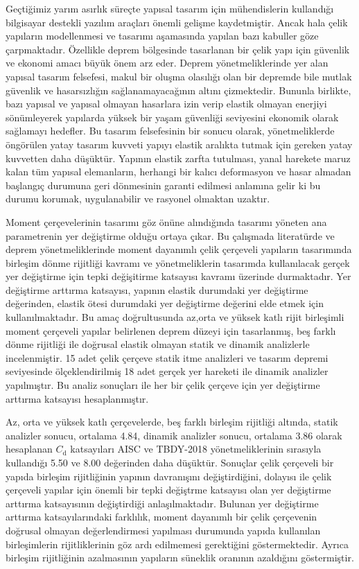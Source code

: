 Geçtiğimiz yarım asırlık süreçte yapısal tasarım için mühendislerin
kullandığı bilgisayar destekli yazılım araçları önemli gelişme kaydetmiştir.
Ancak hala çelik yapıların modellenmesi ve tasarımı aşamasında yapılan
bazı kabuller göze çarpmaktadır. Özellikle deprem bölgesinde tasarlanan
bir çelik yapı için güvenlik ve ekonomi amacı büyük önem arz eder.
Deprem yönetmeliklerinde yer alan yapısal tasarım felsefesi, makul
bir oluşma olasılığı olan bir depremde bile mutlak güvenlik ve hasarsızlığın
sağlanamayacağının altını çizmektedir. Bununla birlikte, bazı yapısal
ve yapısal olmayan hasarlara izin verip elastik olmayan enerjiyi sönümleyerek
yapılarda yüksek bir yaşam güvenliği seviyesini ekonomik olarak sağlamayı
hedefler. Bu tasarım felsefesinin bir sonucu olarak, yönetmeliklerde
öngörülen yatay tasarım kuvveti yapıyı elastik aralıkta tutmak için
gereken yatay kuvvetten daha düşüktür. Yapının elastik zarfta tutulması,
yanal harekete maruz kalan tüm yapısal elemanların, herhangi bir kalıcı
deformasyon ve hasar almadan başlangıç durumuna geri dönmesinin garanti
edilmesi anlamına gelir ki bu durumu korumak, uygulanabilir ve rasyonel
olmaktan uzaktır. 

Moment çerçevelerinin tasarımı göz önüne alındığında tasarımı yöneten
ana parametrenin yer değiştirme olduğu ortaya çıkar. Bu çalışmada
literatürde ve deprem yönetmeliklerinde moment dayanımlı çelik çerçeveli
yapıların tasarımında birleşim dönme rijitliği kavramı ve yönetmeliklerin
tasarımda kullanılacak gerçek yer değiştirme için tepki değişitirme
katsayısı kavramı üzerinde durmaktadır. Yer değiştirme arttırma katsayısı,
yapının elastik durumdaki yer değiştirme değerinden, elastik ötesi
durumdaki yer değiştirme değerini elde etmek için kullanılmaktadır.
Bu amaç doğrultusunda az,orta ve yüksek katlı rijit birleşimli moment
çerçeveli yapılar belirlenen deprem düzeyi için tasarlanmış, beş farklı
dönme rijitliği ile doğrusal elastik olmayan statik ve dinamik analizlerle
incelenmiştir. 15 adet çelik çerçeve statik itme analizleri ve tasarım
depremi seviyesinde ölçeklendirilmiş 18 adet gerçek yer hareketi ile
dinamik analizler yapılmıştır. Bu analiz sonuçları ile her bir çelik
çerçeve için yer değiştirme arttırma katsayısı hesaplanmıştır.

Az, orta ve yüksek katlı çerçevelerde, beş farklı birleşim rijitliği
altında, statik analizler sonucu, ortalama 4.84, dinamik analizler
sonucu, ortalama 3.86 olarak hesaplanan $C_{\mathrm{d}}$ katsayıları
AISC ve TBDY-2018 yönetmeliklerinin sırasıyla kullandığı 5.50 ve 8.00
değerinden daha düşüktür. Sonuçlar çelik çerçeveli bir yapıda birleşim
rijitliğinin yapının davranışını değiştirdiğini, dolayısı ile çelik
çerçeveli yapılar için önemli bir tepki değiştrme katsayısı olan yer
değiştirme arttırma katsayısının değiştirdiği anlaşılmaktadır. Bulunan
yer değiştirme arttırma katsayılarındaki farklılık, moment dayanımlı
bir çelik çerçevenin doğrusal olmayan değerlendirmesi yapılması durumunda
yapıda kullanılan birleşimlerin rijitliklerinin göz ardı edilmemesi
gerektiğini göstermektedir. Ayrıca birleşim rijitliğinin azalmasının
yapıların süneklik oranının azaldığını göstermiştir.